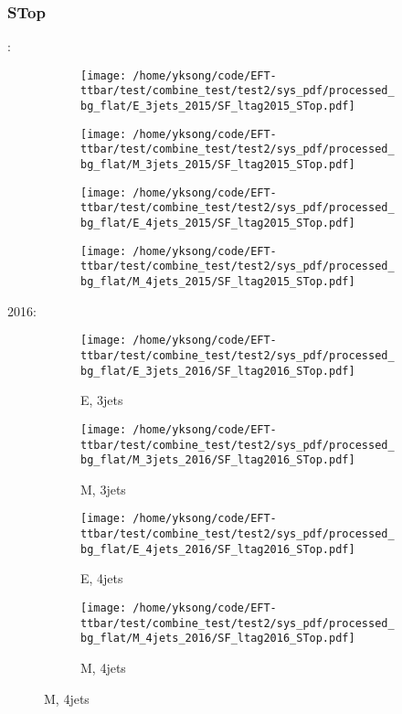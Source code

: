 \documentclass{beamer}
\begin{document}
\begin{frame}
\frametitle{STop}
\fontsize{5}{1}:
\begin{figure}
\centering
\begin{subfigure}[b]{0.24\textwidth}
\texttt{[image: /home/yksong/code/EFT-ttbar/test/combine\_test/test2/sys\_pdf/processed\_bg\_flat/E\_3jets\_2015/SF\_ltag2015\_STop.pdf]}
\end{subfigure}
\begin{subfigure}[b]{0.24\textwidth}
\texttt{[image: /home/yksong/code/EFT-ttbar/test/combine\_test/test2/sys\_pdf/processed\_bg\_flat/M\_3jets\_2015/SF\_ltag2015\_STop.pdf]}
\end{subfigure}
\begin{subfigure}[b]{0.24\textwidth}
\texttt{[image: /home/yksong/code/EFT-ttbar/test/combine\_test/test2/sys\_pdf/processed\_bg\_flat/E\_4jets\_2015/SF\_ltag2015\_STop.pdf]}
\end{subfigure}
\begin{subfigure}[b]{0.24\textwidth}
\texttt{[image: /home/yksong/code/EFT-ttbar/test/combine\_test/test2/sys\_pdf/processed\_bg\_flat/M\_4jets\_2015/SF\_ltag2015\_STop.pdf]}
\end{subfigure}
\end{figure}
2016:
\begin{figure}
\centering
\begin{subfigure}[b]{0.24\textwidth}
\texttt{[image: /home/yksong/code/EFT-ttbar/test/combine\_test/test2/sys\_pdf/processed\_bg\_flat/E\_3jets\_2016/SF\_ltag2016\_STop.pdf]}
\captionsetup{font=tiny}
\caption{E, 3jets}
\end{subfigure}
\begin{subfigure}[b]{0.24\textwidth}
\texttt{[image: /home/yksong/code/EFT-ttbar/test/combine\_test/test2/sys\_pdf/processed\_bg\_flat/M\_3jets\_2016/SF\_ltag2016\_STop.pdf]}
\captionsetup{font=tiny}
\caption{M, 3jets}
\end{subfigure}
\begin{subfigure}[b]{0.24\textwidth}
\texttt{[image: /home/yksong/code/EFT-ttbar/test/combine\_test/test2/sys\_pdf/processed\_bg\_flat/E\_4jets\_2016/SF\_ltag2016\_STop.pdf]}
\captionsetup{font=tiny}
\caption{E, 4jets}
\end{subfigure}
\begin{subfigure}[b]{0.24\textwidth}
\texttt{[image: /home/yksong/code/EFT-ttbar/test/combine\_test/test2/sys\_pdf/processed\_bg\_flat/M\_4jets\_2016/SF\_ltag2016\_STop.pdf]}
\captionsetup{font=tiny}
\caption{M, 4jets}
\end{subfigure}
\end{figure}
\end{frame}
\end{document}
